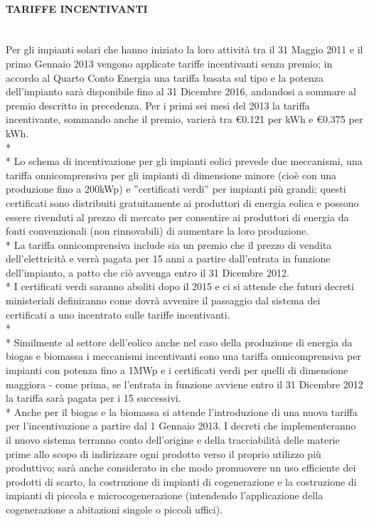 \documentclass[12pt,a4paper,openright,twoside]{report}
\newcommand{\myparagraph}[1]{\paragraph{#1}\mbox{}\\}
\begin{document}
\myparagraph{TARIFFE INCENTIVANTI}
Per gli impianti solari che hanno iniziato la loro attività tra il 31 Maggio 2011 e il primo Gennaio 2013 vengono applicate tariffe incentivanti senza premio; in accordo al Quarto Conto Energia una tariffa basata sul tipo e la potenza dell'impianto sarà disponibile fino al 31 Dicembre 2016, andandosi a sommare al premio descritto in precedenza. Per i primi sei mesi del 2013 la tariffa incentivante, sommando anche il premio, varierà tra \euro0.121 per kWh e \euro0.375 per kWh.
\\*\\*
Lo schema di incentivazione per gli impianti eolici prevede due meccanismi, una tariffa onnicomprensiva per gli impianti di dimensione minore (cioè con una produzione fino a 200kWp) e ''certificati verdi'' per impianti più grandi; questi certificati sono distribuiti gratuitamente ai produttori di energia eolica e possono essere rivenduti al prezzo di mercato per consentire ai produttori di energia da fonti convenzionali (non rinnovabili) di aumentare la loro produzione.\\* La tariffa onnicomprensiva include sia un premio che il prezzo di vendita dell'elettricità e verrà pagata per 15 anni a partire dall'entrata in funzione dell'impianto, a patto che ciò avvenga entro il 31 Dicembre 2012.\\*
I certificati verdi saranno aboliti dopo il 2015 e ci si attende che futuri decreti ministeriali definiranno come dovrà avvenire il passaggio dal sistema dei certificati a uno incentrato sulle tariffe incentivanti.
\\*\\* 
Similmente al settore dell'eolico anche nel caso della produzione di energia da biogas e biomassa i meccanismi incentivanti sono una tariffa onnicomprensiva per impianti con potenza fino a 1MWp e i certificati verdi per quelli di dimensione maggiora - come prima, se l'entrata in funzione avviene entro il 31 Dicembre 2012 la tariffa sarà pagata per i 15 successivi.\\* Anche per il biogas e la biomassa si attende l'introduzione di una nuova tariffa per l'incentivazione a partire dal 1 Gennaio 2013. I decreti che implementeranno il nuovo sistema terranno conto dell'origine e della tracciabilità delle materie prime allo scopo di indirizzare ogni prodotto verso il proprio utilizzo più produttivo; sarà anche considerato in che modo promuovere un uso efficiente dei prodotti di scarto, la costruzione di impianti di cogenerazione e la costruzione di impianti di piccola e microcogenerazione (intendendo l'applicazione della cogenerazione a abitazioni singole o piccoli uffici).
\end{document}
